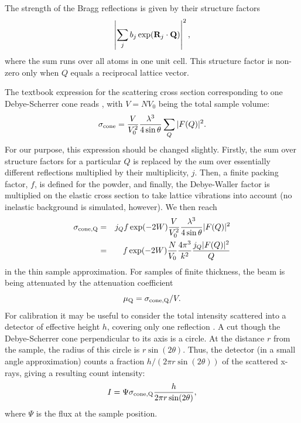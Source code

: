 The strength of the Bragg reflections is given by their structure factors
\begin{equation}
 \left| \sum_j b_j \exp({\bf R}_j \cdot {\bf Q}) \right|^2 ,
\end{equation}
where the sum runs over all atoms in one unit cell. This structure factor is
non-zero only when $Q$ equals a reciprocal lattice vector.

The textbook expression for the scattering cross section
corresponding to one Debye-Scherrer cone reads \cite[ch.3.6]{squires}, with $V=N V_0$ being the total sample volume:
\begin{equation}
\sigma_{\rm cone}
  = \frac{V}{V_0^2} \frac{\lambda^3}{4 \sin \theta} \sum_Q |F(Q)|^2 .
\end{equation}
For our purpose, this expression should be changed slightly.
Firstly, the sum over structure factors for a particular $Q$ is replaced
by the sum over essentially different reflections multiplied by their
multiplicity, $j$. Then, a finite packing factor, $f$, is defined for the powder,
and finally, the Debye-Waller factor is multiplied on the elastic cross section
to take lattice vibrations into account (no inelastic background is simulated,
however). We then reach
\begin{eqnarray}
\sigma_{\rm cone, Q}
 & = & j_Q f \exp(-2W) \frac{V}{V_0^2} \frac{\lambda^3}{4 \sin \theta} |F(Q)|^2 \\
 & = & f \exp(-2W) \frac{N}{V_0} \frac{4\pi^3}{k^2} \frac{j_Q |F(Q)|^2}{Q}
\end{eqnarray}
in the thin sample approximation. For samples of finite thickness, the
beam is being attenuated by the attenuation coefficient
\begin{equation}
\label{e:attenu}
\mu_{\rm Q} = \sigma_{\rm cone,Q} / V .
\end{equation}
For calibration it may be useful to consider the total intensity
scattered into a detector of effective height $h$, covering only
one reflection \cite[ch.3.6]{squires}.
A cut though the Debye-Scherrer cone perpendicular to its axis
is a circle. At the distance $r$ from the sample, the radius of this
circle is $r \sin(2\theta)$. Thus, the detector (in a small angle
approximation) counts a fraction $h / (2 \pi r \sin(2 \theta))$
of the scattered x-rays, giving a resulting count intensity:
\begin{equation}
I = \Psi \sigma_{\rm cone,Q} \frac{h}{2 \pi r \sin(2\theta)} ,
\end{equation}
where $\Psi$ is the flux at the sample position.

